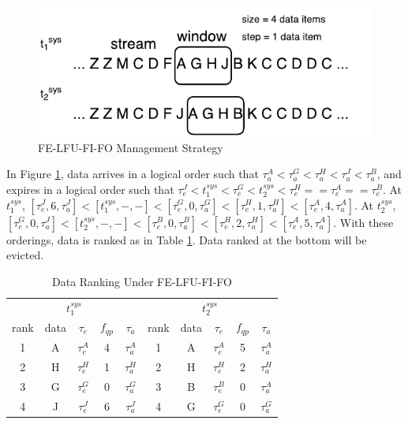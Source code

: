\begin{figure}[!htbp]
	\centering
    \includegraphics[width=5in]{img/3-sifelfufifo.pdf}
    \caption{FE-LFU-FI-FO Management Strategy}
    \label{fig:3-sifelfufifo}
\end{figure}

In Figure \ref{fig:3-sifelfufifo}, data arrives in a logical order such that $\tau^{A}_{a} < \tau^{G}_{a} < \tau^{H}_{a} < \tau^{J}_{a} < \tau^{B}_{a}$, and expires in a logical order such that  $\tau^{J}_{e} < t^{sys}_{1} < \tau^{G}_{e} < t^{sys}_{2} < \tau^{H}_{e} == \tau^{A}_{e} == \tau^{B}_{e}$.
At $t^{sys}_{1}$, $[\tau^{J}_{e}, 6, \tau^{J}_{a}] < [t^{sys}_{1}, -, -] < [\tau^{G}_{e}, 0, \tau^{G}_{a}] < [\tau^{H}_{e}, 1, \tau^{H}_{a}] < [\tau^{A}_{e}, 4, \tau^{A}_{a}]$. 
At $t^{sys}_{2}$, $[\tau^{G}_{e}, 0, \tau^{J}_{a}] < [t^{sys}_{2}, -, -] < [\tau^{B}_{e}, 0, \tau^{B}_{a}] < [\tau^{H}_{e}, 2, \tau^{H}_{a}] < [\tau^{A}_{e}, 5, \tau^{A}_{a}]$. 
With these orderings, data is ranked as in Table \ref{tab:felfufifo}. 
Data ranked at the bottom will be evicted. 

\begin{table}[!htbp]
\centering
\caption{Data Ranking Under FE-LFU-FI-FO}
\label{tab:felfufifo}
\begin{tabular}{|c|c|c|c|c||c|c|c|c|c|}
\hline
\multicolumn{5}{|c||}{$t^{sys}_{1}$} & \multicolumn{5}{c|}{$t^{sys}_{2}$} \\ \hhline{|==========|}
rank & data & $\tau_{e}$ & $f_{qp}$ & $\tau_{a}$ & rank & data & $\tau_{e}$ & $f_{qp}$ & $\tau_{a}$ \\ \hhline{|=|=|=|=|=#=|=|=|=|=|}
1 & A & $\tau^{A}_{e}$ & 4 & $\tau^{A}_{a}$ & 1 & A & $\tau^{A}_{e}$ & 5 & $\tau^{A}_{a}$ \\ \hline
2 & H & $\tau^{H}_{e}$ & 1 & $\tau^{H}_{a}$ & 2 & H & $\tau^{H}_{e}$ & 2 & $\tau^{H}_{a}$ \\ \hline
3 & G & $\tau^{G}_{e}$ & 0 & $\tau^{G}_{a}$ & 3 & B & $\tau^{B}_{e}$ & 0 & $\tau^{A}_{a}$ \\ \hline
4 & J & $\tau^{J}_{e}$ & 6 & $\tau^{J}_{a}$ & 4 & G & $\tau^{G}_{e}$ & 0 & $\tau^{G}_{a}$ \\ \hline
\end{tabular}
\end{table}

